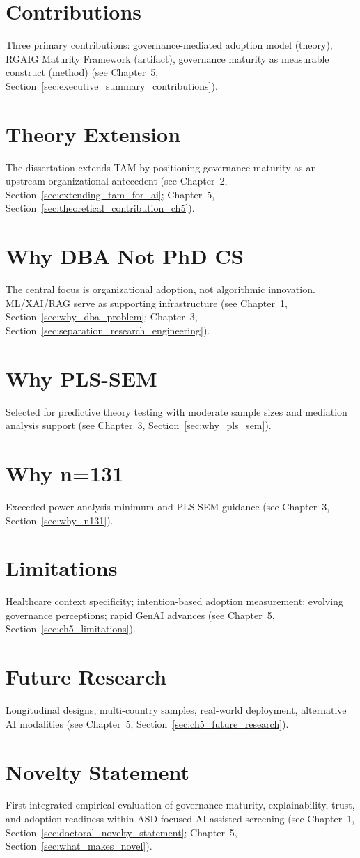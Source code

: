\section{Contributions}
Three primary contributions: governance-mediated adoption model (theory), RGAIG Maturity Framework (artifact), governance maturity as measurable construct (method) (see Chapter~5, Section~\ref{sec:executive_summary_contributions}).

\section{Theory Extension}
The dissertation extends TAM by positioning governance maturity as an upstream organizational antecedent (see Chapter~2, Section~\ref{sec:extending_tam_for_ai}; Chapter~5, Section~\ref{sec:theoretical_contribution_ch5}).

\section{Why DBA Not PhD CS}
The central focus is organizational adoption, not algorithmic innovation. ML/XAI/RAG serve as supporting infrastructure (see Chapter~1, Section~\ref{sec:why_dba_problem}; Chapter~3, Section~\ref{sec:separation_research_engineering}).

\section{Why PLS-SEM}
Selected for predictive theory testing with moderate sample sizes and mediation analysis support (see Chapter~3, Section~\ref{sec:why_pls_sem}).

\section{Why n=131}
Exceeded power analysis minimum and PLS-SEM guidance (see Chapter~3, Section~\ref{sec:why_n131}).

\section{Limitations}
Healthcare context specificity; intention-based adoption measurement; evolving governance perceptions; rapid GenAI advances (see Chapter~5, Section~\ref{sec:ch5_limitations}).

\section{Future Research}
Longitudinal designs, multi-country samples, real-world deployment, alternative AI modalities (see Chapter~5, Section~\ref{sec:ch5_future_research}).

\section{Novelty Statement}
First integrated empirical evaluation of governance maturity, explainability, trust, and adoption readiness within ASD-focused AI-assisted screening (see Chapter~1, Section~\ref{sec:doctoral_novelty_statement}; Chapter~5, Section~\ref{sec:what_makes_novel}).
